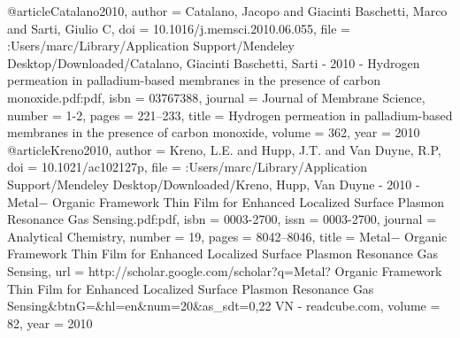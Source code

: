 @article{Catalano2010,
author = {Catalano, Jacopo and {Giacinti Baschetti}, Marco and Sarti, Giulio C},
doi = {10.1016/j.memsci.2010.06.055},
file = {:Users/marc/Library/Application Support/Mendeley Desktop/Downloaded/Catalano, Giacinti Baschetti, Sarti - 2010 - Hydrogen permeation in palladium-based membranes in the presence of carbon monoxide.pdf:pdf},
isbn = {03767388},
journal = {Journal of Membrane Science},
number = {1-2},
pages = {221--233},
title = {{Hydrogen permeation in palladium-based membranes in the presence of carbon monoxide}},
volume = {362},
year = {2010}
}
@article{Kreno2010,
author = {Kreno, L.E. and Hupp, J.T. and {Van Duyne}, R.P},
doi = {10.1021/ac102127p},
file = {:Users/marc/Library/Application Support/Mendeley Desktop/Downloaded/Kreno, Hupp, Van Duyne - 2010 - Metal− Organic Framework Thin Film for Enhanced Localized Surface Plasmon Resonance Gas Sensing.pdf:pdf},
isbn = {0003-2700},
issn = {0003-2700},
journal = {Analytical Chemistry},
number = {19},
pages = {8042--8046},
title = {{Metal− Organic Framework Thin Film for Enhanced Localized Surface Plasmon Resonance Gas Sensing}},
url = {http://scholar.google.com/scholar?q=Metal? Organic Framework Thin Film for Enhanced Localized Surface Plasmon Resonance Gas Sensing{\&}btnG={\&}hl=en{\&}num=20{\&}as{\_}sdt=0,22 VN  - readcube.com},
volume = {82},
year = {2010}
}
